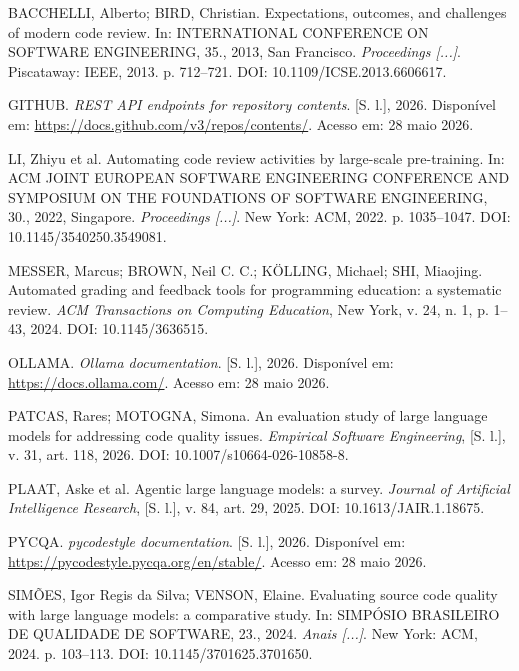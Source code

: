 \documentclass[12pt]{article}
\begin{document}
\begin{thebibliography}{}

BACCHELLI, Alberto; BIRD, Christian. Expectations, outcomes, and challenges of
modern code review. In: INTERNATIONAL CONFERENCE ON SOFTWARE ENGINEERING, 35.,
2013, San Francisco. \textit{Proceedings [...]}. Piscataway: IEEE, 2013.
p. 712--721. DOI: 10.1109/ICSE.2013.6606617.

GITHUB. \textit{REST API endpoints for repository contents}. [S. l.], 2026.
Disponível em: \url{https://docs.github.com/v3/repos/contents/}. Acesso em:
28 maio 2026.

LI, Zhiyu et al. Automating code review activities by large-scale pre-training.
In: ACM JOINT EUROPEAN SOFTWARE ENGINEERING CONFERENCE AND SYMPOSIUM ON THE
FOUNDATIONS OF SOFTWARE ENGINEERING, 30., 2022, Singapore.
\textit{Proceedings [...]}. New York: ACM, 2022. p. 1035--1047.
DOI: 10.1145/3540250.3549081.

MESSER, Marcus; BROWN, Neil C. C.; K{\"O}LLING, Michael; SHI, Miaojing.
Automated grading and feedback tools for programming education: a systematic
review. \textit{ACM Transactions on Computing Education}, New York, v. 24, n. 1,
p. 1--43, 2024. DOI: 10.1145/3636515.

OLLAMA. \textit{Ollama documentation}. [S. l.], 2026. Disponível em:
\url{https://docs.ollama.com/}. Acesso em: 28 maio 2026.

PATCAS, Rares; MOTOGNA, Simona. An evaluation study of large language models
for addressing code quality issues. \textit{Empirical Software Engineering},
[S. l.], v. 31, art. 118, 2026. DOI: 10.1007/s10664-026-10858-8.

PLAAT, Aske et al. Agentic large language models: a survey. \textit{Journal of
Artificial Intelligence Research}, [S. l.], v. 84, art. 29, 2025.
DOI: 10.1613/JAIR.1.18675.

PYCQA. \textit{pycodestyle documentation}. [S. l.], 2026. Disponível em:
\url{https://pycodestyle.pycqa.org/en/stable/}. Acesso em: 28 maio 2026.

SIMÕES, Igor Regis da Silva; VENSON, Elaine. Evaluating source code quality
with large language models: a comparative study. In: SIMPÓSIO BRASILEIRO DE
QUALIDADE DE SOFTWARE, 23., 2024. \textit{Anais [...]}. New York: ACM, 2024.
p. 103--113. DOI: 10.1145/3701625.3701650.


\end{thebibliography}
\end{document}

